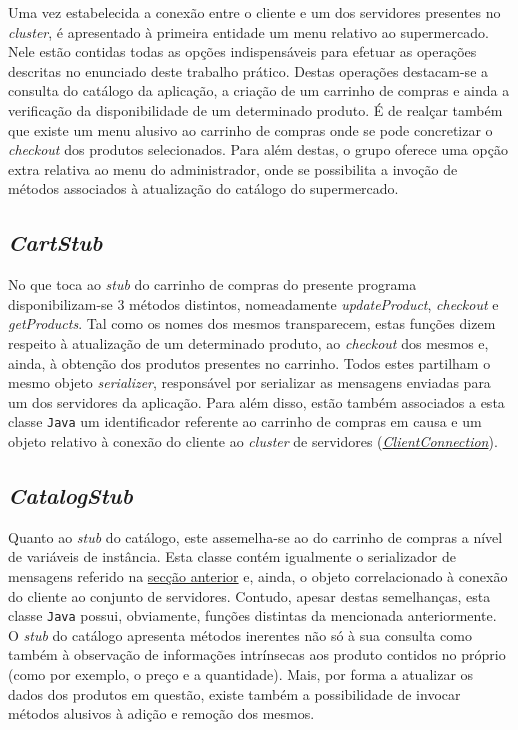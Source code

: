 \documentclass[a4paper]{report}
\begin{document}
{		Uma vez estabelecida a conexão entre o cliente e um dos servidores presentes no \textit{cluster}, é apresentado à primeira entidade um menu relativo ao supermercado. Nele estão contidas todas as opções indispensáveis para efetuar as operações descritas no enunciado deste trabalho prático.
		Destas operações destacam-se a consulta do catálogo da aplicação, a criação de um carrinho de compras e ainda a verificação da disponibilidade de um determinado produto.
		É de realçar também que existe um menu alusivo ao carrinho de compras onde se pode concretizar o \textit{checkout} dos produtos selecionados.
		Para além destas, o grupo oferece uma opção extra relativa ao menu do administrador, onde se possibilita a invoção de métodos associados à atualização do catálogo do supermercado.

		\subsection{\textit{CartStub}} \label{subsec:ClientCartStub}
		No que toca ao \textit{stub} do carrinho de compras do presente programa disponibilizam-se 3 métodos distintos, nomeadamente \textit{updateProduct}, \textit{checkout} e \textit{getProducts}.
		Tal como os nomes dos mesmos transparecem, estas funções dizem respeito à atualização de um determinado produto, ao \textit{checkout} dos mesmos e, ainda, à obtenção dos produtos presentes no carrinho.
		Todos estes partilham o mesmo objeto \textit{serializer}, responsável por serializar as mensagens enviadas para um dos servidores da aplicação.
		Para além disso, estão também associados a esta classe \texttt{Java} um identificador referente ao carrinho de compras em causa e um objeto relativo à conexão do cliente ao \textit{cluster} de servidores (\hyperref[subsec:ClientConnection]{\textit{ClientConnection}}).

		\subsection{\textit{CatalogStub}} \label{subsec:ClientCatalogStub}
		Quanto ao \textit{stub} do catálogo, este assemelha-se ao do carrinho de compras a nível de variáveis de instância. Esta classe contém igualmente o serializador de mensagens referido na \hyperref[subsec:ClientCartStub]{secção anterior} e, ainda, o objeto correlacionado à conexão do cliente ao conjunto de servidores.
		Contudo, apesar destas semelhanças, esta classe \texttt{Java} possui, obviamente, funções distintas da mencionada anteriormente.
		O \textit{stub} do catálogo apresenta métodos inerentes não só à sua consulta como também à observação de informações intrínsecas aos produto contidos no próprio (como por exemplo, o preço e a quantidade).
		Mais, por forma a atualizar os dados dos produtos em questão, existe também a possibilidade de invocar métodos alusivos à adição e remoção dos mesmos.
}
\end{document}
